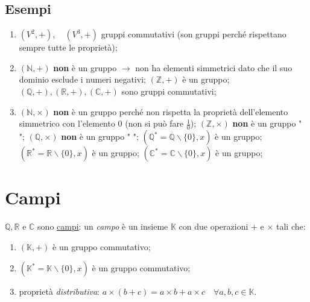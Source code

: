 	\subsection{Esempi}
		\begin{enumerate}
			\item $ (V^2, +), \quad (V^3, +) $ gruppi commutativi (son gruppi perché rispettano sempre tutte le proprietà);
			\item $ (\mathbb{N}, +) $ \textbf{non} è un gruppo $ \rightarrow $ non ha elementi simmetrici dato che il suo dominio esclude i numeri negativi;
			\newline $ (\mathbb{Z}, +) $ è un gruppo;
			\newline $ (\mathbb{Q}, +), (\mathbb{R}, +), (\mathbb{C}, +) $ sono gruppi commutativi;
			\item $ (\mathbb{N}, \times) $ \textbf{non} è un gruppo perché non rispetta la proprietà dell'elemento simmetrico con l'elemento 0 (non si può fare $ \frac{1}{0} $);
			\newline $ (\mathbb{Z}, \times) $ \textbf{non} è un gruppo " ";
			\newline $ (\mathbb{Q}, \times) $ \textbf{non} è un gruppo " ";
			\newline $ ( \mathbb{Q}^* = \mathbb{Q} \backslash \{0\}, x) $ è un gruppo;
			\newline $ ( \mathbb{R}^* = \mathbb{R} \backslash \{0\}, x) $ è un gruppo;
			\newline $ ( \mathbb{C}^* = \mathbb{C} \backslash \{0\}, x) $ è un gruppo;
		\end{enumerate}

\section{Campi}
	$ \mathbb{Q}, \mathbb{R} $ e $ \mathbb{C} $ sono \underline{campi}:
	\newline un \textit{campo} è un insieme $ \mathbb{K}	 $ con due operazioni + e $ \times $ tali che:
	\begin{enumerate}
		\item $ ( \mathbb{K}, +) $ è un gruppo commutativo;
		\item $ ( \mathbb{K}^* = \mathbb{K} \backslash \{0\}, x) $ è un gruppo commutativo;
		\item proprietà \textit{distributiva}: $ a \times ( b + c ) = a \times b + a \times c \quad \forall a, b, c \in \mathbb{K} $.
	\end{enumerate}

